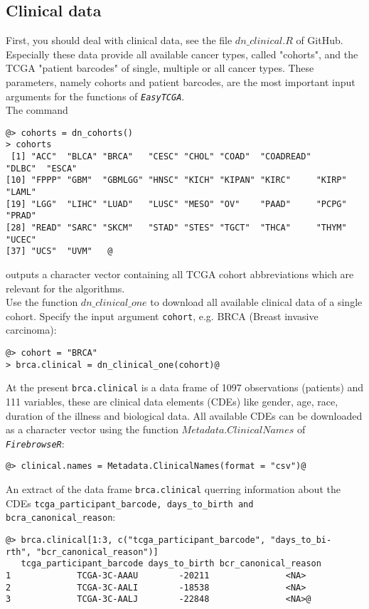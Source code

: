\documentclass{TechReport}
\begin{document}
\subsection{Clinical data}
First, you should deal with clinical data, see the file $dn\_clinical.R$ of GitHub.
Especially these data provide all available cancer types, called "cohorts", 
and the TCGA  "patient barcodes"  of single, multiple or all cancer types. These
parameters, namely cohorts and patient barcodes, are the most
important input arguments for the functions of \texttt{\em EasyTCGA}. \\
The command
\begin{lstlisting}[style=base]
@> cohorts = dn_cohorts()
> cohorts
 [1] "ACC"  "BLCA" "BRCA"   "CESC" "CHOL" "COAD"  "COADREAD" 
"DLBC"  "ESCA"    
[10] "FPPP" "GBM"  "GBMLGG" "HNSC" "KICH" "KIPAN" "KIRC"     "KIRP"  "LAML"    
[19] "LGG"  "LIHC" "LUAD"   "LUSC" "MESO" "OV"    "PAAD"     "PCPG"  "PRAD"    
[28] "READ" "SARC" "SKCM"   "STAD" "STES" "TGCT"  "THCA"     "THYM"  "UCEC"    
[37] "UCS"  "UVM"   @
\end{lstlisting}
outputs a character vector containing all TCGA cohort abbreviations which are
relevant for the algorithms.\\
Use the function $dn\_clinical\_one$ to download all available clinical data of a
single cohort. Specify the input argument {\tt cohort}, e.g. BRCA 
(Breast invasive carcinoma):  
\begin{lstlisting}[style=base]
@> cohort = "BRCA"
> brca.clinical = dn_clinical_one(cohort)@
\end{lstlisting}
At the present {\tt brca.clinical} is a data frame of 1097 observations (patients)
and 111 variables, these are clinical data elements (CDEs) like 
gender, age, race, duration of the illness and biological data. All available CDEs
can be downloaded as a character vector using the 
function $Metadata.ClinicalNames$ of \texttt{\em FirebrowseR}:
\begin{lstlisting}[style=base]
@> clinical.names = Metadata.ClinicalNames(format = "csv")@
\end{lstlisting}
An extract of the data frame {\tt brca.clinical} querring information about the CDEs
{\tt tcga\_participant\_barcode, days\_to\_birth and bcra\_canonical\_reason}:
\begin{lstlisting}[style=base]
@> brca.clinical[1:3, c("tcga_participant_barcode", "days_to_bi-
rth", "bcr_canonical_reason")]
   tcga_participant_barcode days_to_birth bcr_canonical_reason
1             TCGA-3C-AAAU        -20211               <NA>
2             TCGA-3C-AALI        -18538               <NA>
3             TCGA-3C-AALJ        -22848               <NA>@
\end{lstlisting}
\end{document}
